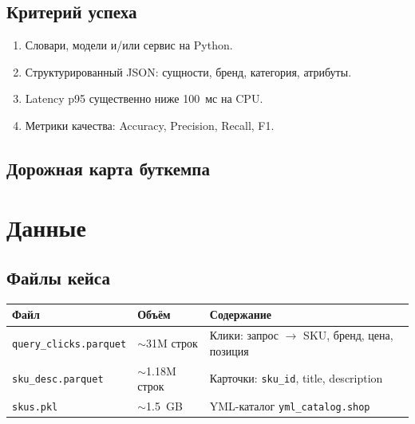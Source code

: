 \documentclass[11pt,a4paper]{article}
\begin{document}
\subsection{Критерий успеха}

\begin{enumerate}
    \item Словари, модели и/или сервис на Python.
    \item Структурированный JSON: сущности, бренд, категория, атрибуты.
    \item Latency p95 существенно ниже 100~мс на CPU.
    \item Метрики качества: Accuracy, Precision, Recall, F1.
\end{enumerate}

\subsection{Дорожная карта буткемпа}

\begin{center}
\end{center}

\newpage

\section{Данные}

\subsection{Файлы кейса}

\begin{table}[H]
\centering
\begin{tabular}{@{}llp{7.5cm}@{}}
\toprule
\textbf{Файл} & \textbf{Объём} & \textbf{Содержание} \\
\midrule
\texttt{query\_clicks.parquet} & $\sim$31M строк & Клики: запрос $\to$ SKU, бренд, цена, позиция \\
\texttt{sku\_desc.parquet} & $\sim$1.18M строк & Карточки: \texttt{sku\_id}, title, description \\
\texttt{skus.pkl} & $\sim$1.5~GB & YML-каталог \texttt{yml\_catalog.shop} \\
\bottomrule
\end{tabular}
\end{table}
\end{document}
